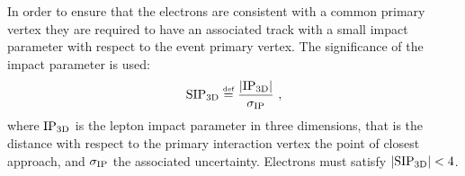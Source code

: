 In order to ensure that the electrons are consistent with a common primary vertex
they are required to have an associated track with a small impact parameter with respect to the event primary vertex.
The significance of the impact parameter is used:
\begin{equation}
\label{eq:SIP3D}
\SIPthreeD \mathdefined \frac{|\rm IP_{3D}|}{\sigma_{\rm IP}} \ ,
\end{equation}
where ${\rm IP_{3D}}$ is the lepton impact parameter in three dimensions,
that is the distance with respect to the primary interaction vertex the point of closest approach,
and $\sigma_{\rm IP}$ the associated uncertainty.
Electrons must satisfy $|\mathrm{SIP}_{\mathrm{3D}}| < 4$.
